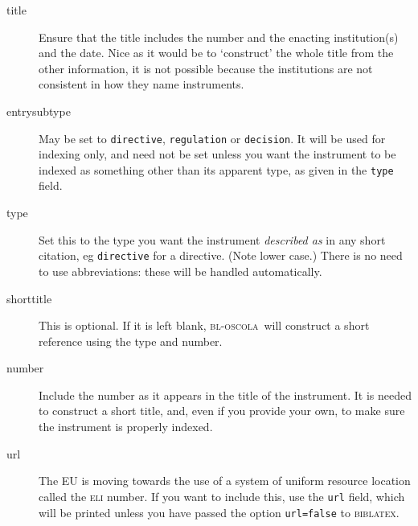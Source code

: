 \documentclass[a4paper,
               11pt,
	       DIV=1,			   
	       footinclude=false]
	      {scrartcl}
\newcommand{\oscola}{\textsc{bl-oscola}}
\newcommand{\biblatex}{\textsc{biblatex}}
\begin{document}
\begin{description}
  \item[title] 
Ensure that the title includes the number and the
  enacting institution(s) and the date. Nice as it would be to
  `construct' the whole title from the other information, it is not
  possible because the institutions are not consistent in how they
  name instruments.
  \item[entrysubtype] 
  May be set to \texttt{directive},
  \texttt{regulation} or \texttt{decision}. It will be used for
  indexing only, and need not be set unless you want the instrument to
  be indexed as something other than its apparent type, as
  given in the \texttt{type} field.
  \item[type]
    Set this to the type you want the instrument
  \emph{described as}
  in any short citation, eg \texttt{directive} for a directive. 
  (Note lower case.) There is no need to use abbreviations: these 
  will be handled automatically.
  \item[shorttitle] 
  This is optional. If it is left blank,
  \oscola\ will construct a short reference using the type and number.
  \item[number] 
  Include the number as it appears in the title of
  the instrument. It is needed to construct a short title, and, even
  if you provide your own, to make sure the instrument is properly
  indexed.
\item[url]
  The EU is moving towards the use of a system of uniform resource location called the \textsc{eli} number. If you want to include this, use the \texttt{url} field, which will be printed unless you have passed the option \verb|url=false| to \biblatex.
\end{description}
\end{document}
